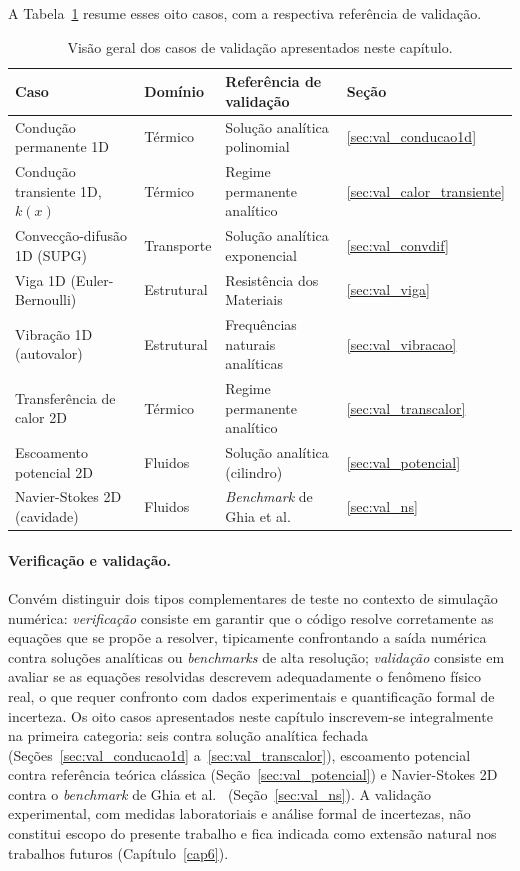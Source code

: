 A Tabela~\ref{tab:visao_casos} resume esses oito casos, com a respectiva referência de validação.

\begin{table}[H]
\centering
\caption{Visão geral dos casos de validação apresentados neste capítulo.}
\label{tab:visao_casos}
\footnotesize
\begin{tabular}{llll}
\hline
\textbf{Caso} & \textbf{Domínio} & \textbf{Referência de validação} & \textbf{Seção} \\
\hline
Condução permanente 1D            & Térmico    & Solução analítica polinomial            & \ref{sec:val_conducao1d} \\
Condução transiente 1D, $k(x)$    & Térmico    & Regime permanente analítico             & \ref{sec:val_calor_transiente} \\
Convecção-difusão 1D (SUPG)       & Transporte & Solução analítica exponencial           & \ref{sec:val_convdif} \\
Viga 1D (Euler-Bernoulli)         & Estrutural & Resistência dos Materiais               & \ref{sec:val_viga} \\
Vibração 1D (autovalor)           & Estrutural & Frequências naturais analíticas         & \ref{sec:val_vibracao} \\
Transferência de calor 2D         & Térmico    & Regime permanente analítico             & \ref{sec:val_transcalor} \\
Escoamento potencial 2D           & Fluidos    & Solução analítica (cilindro)            & \ref{sec:val_potencial} \\
Navier-Stokes 2D (cavidade)       & Fluidos    & \textit{Benchmark} de Ghia et al.\ \cite{Ghia1982} & \ref{sec:val_ns} \\
\hline
\end{tabular}
\end{table}

\paragraph{Verificação e validação.} Convém distinguir dois tipos complementares de teste no contexto de simulação numérica: \emph{verificação} consiste em garantir que o código resolve corretamente as equações que se propõe a resolver, tipicamente confrontando a saída numérica contra soluções analíticas ou \emph{benchmarks} de alta resolução; \emph{validação} consiste em avaliar se as equações resolvidas descrevem adequadamente o fenômeno físico real, o que requer confronto com dados experimentais e quantificação formal de incerteza. Os oito casos apresentados neste capítulo inscrevem-se integralmente na primeira categoria: seis contra solução analítica fechada (Seções~\ref{sec:val_conducao1d} a~\ref{sec:val_transcalor}), escoamento potencial contra referência teórica clássica (Seção~\ref{sec:val_potencial}) e Navier-Stokes 2D contra o \emph{benchmark} de Ghia et al.\ \cite{Ghia1982} (Seção~\ref{sec:val_ns}). A validação experimental, com medidas laboratoriais e análise formal de incertezas, não constitui escopo do presente trabalho e fica indicada como extensão natural nos trabalhos futuros (Capítulo~\ref{cap6}).

